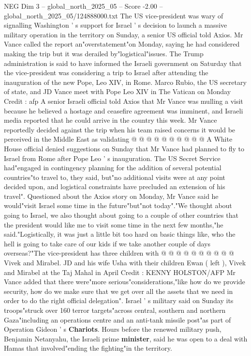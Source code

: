 \begin{textsample}{NEG Dim 3 – global\_north\_2025\_05 – Score -2.00 – global\_north\_2025\_05/124888000.txt}  \label{ex:f3_neg_310}
The US vice-president was wary of signalling Washington ' s support for Israel ' s decision to launch a massive military operation in the territory on Sunday, a senior US official told Axios.
Mr Vance called the report an"overstatement"on Monday, saying he had considered making the trip but it was derailed by"logistical"issues.
The Trump administration is said to have informed the Israeli government on Saturday that the vice-president was considering a trip to Israel after attending the inauguration of the new Pope, Leo XIV, in Rome.
Marco Rubio, the US secretary of state, and JD Vance meet with Pope Leo XIV in The Vatican on Monday Credit : afp A senior Israeli official told Axios that Mr Vance was mulling a visit because he believed a hostage and ceasefire agreement was imminent, and Israeli media reported that he could arrive in the country this week.
Mr Vance reportedly decided against the trip when his team raised concerns it would be perceived in the Middle East as validating @ @ @ @ @ @ @ @ @ @ A White House official denied suggestions on Sunday that Mr Vance had planned to fly to Israel from Rome after Pope Leo ' s inauguration.
The US Secret Service had"engaged in contingency planning for the addition of several potential countries"to travel to, they said, but"no additional visits were at any point decided upon, and logistical constraints have precluded an extension of his travel".
Questioned about the Axios story on Monday, Mr Vance said he would"visit Israel some time in the future"but"not today"."We thought about going to Israel, we also thought about going to a couple of other countries that the president would like me to visit some time in the next few months,"he said."Logistically, it was just a little bit too hard on basic things like, who the hell is going to take care of our kids if we take another couple of days overseas?"The vice-president has three children with @ @ @ @ @ @ @ @ @ @ Vivek and Mirabel.
JD and his wife Usha with their children Ewan ( left ), Vivek and Mirabel at the Taj Mahal in April Credit : KENNY HOLSTON/AFP Mr Vance added that there were"more serious"considerations,"like how do we provide security, how do we make sure that we get over all the assets that we need in order to do the right official delegation".
Israel ' s military said on Sunday its troops"struck over 160 terror targets"across central, southern and northern Gaza"including an operations centre and an anti-tank missile post"as part of Operation Gideon ' s \textbf{Chariots}.
Hours before the renewed military push, Benjamin Netanyahu, the Israeli prime \textbf{minister}, said he was open to a deal with Hamas that involved"ending the fighting"in the territory.

\end{textsample}
